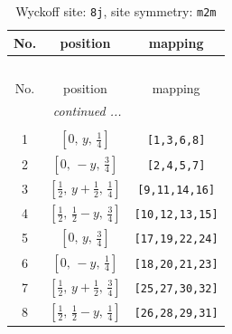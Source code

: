 \documentclass[fleqn,8pt]{jsarticle}
\begin{document}
\begin{longtable}{ccc}
\caption{Wyckoff site: {\tt 8j}, site symmetry: {\tt m2m}}
 \\
 \hline \hline
No. & position & mapping \\ \hline \endfirsthead

\multicolumn{2}{l}{\tablename\ \thetable{}} \\
 \hline \hline
No. & position & mapping \\ \hline \endhead

 \hline \hline
\multicolumn{2}{r}{\footnotesize\it continued ...} \\ \endfoot

 \hline \hline
\multicolumn{2}{r}{} \\ \endlastfoot

1 & $\left[ 0,\, y,\, \frac{1}{4} \right]$ & {\tt [1,3,6,8]} \\ \hline
2 & $\left[ 0,\, - y,\, \frac{3}{4} \right]$ & {\tt [2,4,5,7]} \\ \hline
3 & $\left[ \frac{1}{2},\, y + \frac{1}{2},\, \frac{1}{4} \right]$ & {\tt [9,11,14,16]} \\ \hline
4 & $\left[ \frac{1}{2},\, \frac{1}{2} - y,\, \frac{3}{4} \right]$ & {\tt [10,12,13,15]} \\ \hline
5 & $\left[ 0,\, y,\, \frac{3}{4} \right]$ & {\tt [17,19,22,24]} \\ \hline
6 & $\left[ 0,\, - y,\, \frac{1}{4} \right]$ & {\tt [18,20,21,23]} \\ \hline
7 & $\left[ \frac{1}{2},\, y + \frac{1}{2},\, \frac{3}{4} \right]$ & {\tt [25,27,30,32]} \\ \hline
8 & $\left[ \frac{1}{2},\, \frac{1}{2} - y,\, \frac{1}{4} \right]$ & {\tt [26,28,29,31]} \\
\end{longtable}
\renewcommand{\arraystretch}{1.2}
\end{document}
